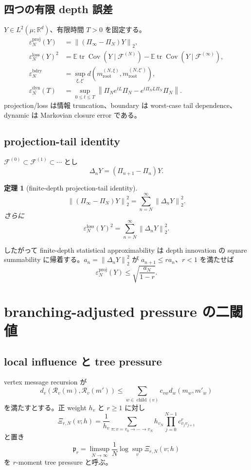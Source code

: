 \documentclass[11pt,a4paper,openany]{book}
\newtheorem{theorem}[definition]{定理}
\numberwithin{equation}{chapter}
\newcommand{\E}{\mathbb E}
\newcommand{\Cov}{\operatorname{Cov}}
\newcommand{\cF}{\mathcal F}
\newcommand{\cR}{\mathcal R}
\newcommand{\R}{\mathbb R}
\newcommand{\tr}{\operatorname{tr}}
\newcommand{\norm}[1]{\left\lVert #1\right\rVert}
\begin{document}
\section{四つの有限 depth 誤差}
$Y\in L^2(\mu;\R^d)$、有限時間 $T>0$ を固定する。
\begin{align}
\varepsilon_N^{\mathrm{proj}}(Y)
&=\norm{(\Pi_\infty-\Pi_N)Y}_2,\\
\varepsilon_N^{\mathrm{loss}}(Y)^2
&=\E\tr\Cov(Y\mid\cF^{(N)})
-\E\tr\Cov(Y\mid\cF^{(\infty)}),\\
\varepsilon_N^{\mathrm{bdry}}
&=\sup_{\xi,\xi'}d(m_{\mathrm{root}}^{(N,\xi)},m_{\mathrm{root}}^{(N,\xi')}),\\
\varepsilon_N^{\mathrm{dyn}}(T)
&=\sup_{0\le t\le T}
\norm{\Pi_Ne^{tL}\Pi_N-e^{t\Pi_NL\Pi_N}\Pi_N}.
\end{align}
projection/loss は情報 truncation、boundary は worst-case tail dependence、dynamic は Markovian closure error である。

\section{projection-tail identity}
$\cF^{(0)}\subset\cF^{(1)}\subset\cdots$ とし
\[
\Delta_nY=(\Pi_{n+1}-\Pi_n)Y.
\]

\begin{theorem}[finite-depth projection-tail identity]
\[
\boxed{
\norm{(\Pi_\infty-\Pi_N)Y}_2^2
=\sum_{n=N}^{\infty}\norm{\Delta_nY}_2^2.}
\]
さらに
\[
\boxed{
\varepsilon_N^{\mathrm{loss}}(Y)^2
=\sum_{n=N}^{\infty}\norm{\Delta_nY}_2^2.}
\]
\end{theorem}

したがって finite-depth statistical approximability は depth innovation の square summability に帰着する。$a_n=\norm{\Delta_nY}_2^2$ が $a_{n+1}\le ra_n$、$r<1$ を満たせば
\[
\varepsilon_N^{\mathrm{proj}}(Y)
\le\sqrt{\frac{a_N}{1-r}}.
\]

\chapter{branching-adjusted pressure の二閾値}
\section{local influence と tree pressure}
vertex message recursion が
\[
d_v(\cR_v(m),\cR_v(m'))
\le\sum_{w\in\operatorname{child}(v)}c_{vw}d_w(m_w,m'_w)
\]
を満たすとする。正 weight $h_v$ と $r\ge1$ に対し
\[
\Xi_{r,N}(v;h)
=\frac1{h_v}
\sum_{\pi:v=v_0\to\cdots\to v_N}
 h_{v_N}\prod_{j=0}^{N-1}c_{v_jv_{j+1}}^r
\]
と置き
\[
\mathfrak p_r
=\limsup_{N\to\infty}
\frac1N\log\sup_v\Xi_{r,N}(v;h)
\]
を $r$-moment tree pressure と呼ぶ。
\end{document}

